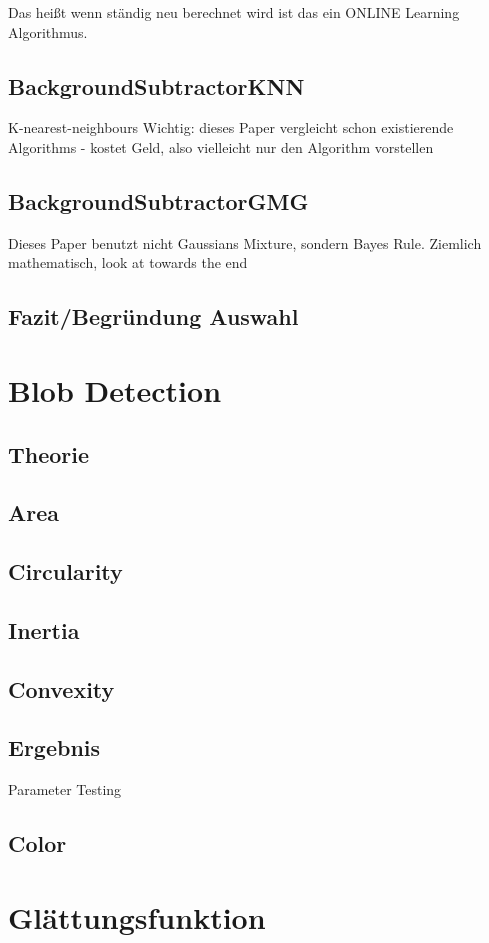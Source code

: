 Das heißt wenn ständig neu berechnet wird ist das ein ONLINE Learning Algorithmus.
\cite{Bowden}
\subsection{BackgroundSubtractorKNN}
K-nearest-neighbours
Wichtig: dieses Paper vergleicht schon existierende Algorithms
- kostet Geld, also vielleicht nur den Algorithm vorstellen
\cite{ZIVKOVIC2006773}
\subsection{BackgroundSubtractorGMG}
Dieses Paper benutzt nicht Gaussians Mixture, sondern Bayes Rule. Ziemlich mathematisch, look at towards the end
\cite{6315174}
\subsection{Fazit/Begründung Auswahl}
\section{Blob Detection}
\subsection{Theorie}
\subsection{Area}
\subsection{Circularity}
\subsection{Inertia}
\subsection{Convexity}
\subsection{Ergebnis}
Parameter Testing
\subsection{Color}
\section{Glättungsfunktion}